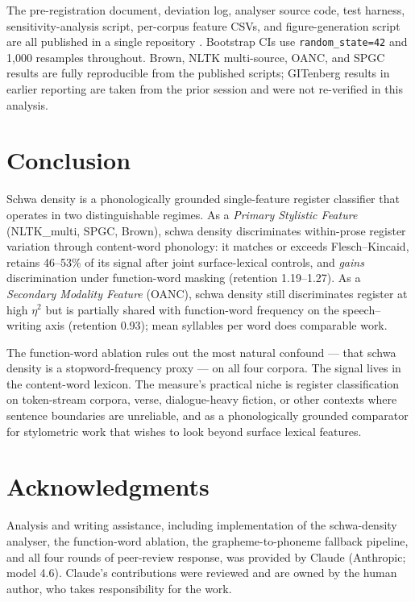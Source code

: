\documentclass[11pt,a4paper]{article}
\begin{document}
The pre-registration document, deviation log, analyser source code,
test harness, sensitivity-analysis script, per-corpus feature CSVs,
and figure-generation script are all published in a single repository
\citep{repo}. Bootstrap CIs use \texttt{random\_state=42} and 1{,}000
resamples throughout. Brown, NLTK multi-source, OANC, and SPGC results
are fully reproducible from the published scripts; GITenberg results
in earlier reporting are taken from the prior session and were not
re-verified in this analysis.

\section{Conclusion}

Schwa density is a phonologically grounded single-feature register
classifier that operates in two distinguishable regimes. As a
\emph{Primary Stylistic Feature} (NLTK\_multi, SPGC, Brown), schwa
density discriminates within-prose register variation through
content-word phonology: it matches or exceeds Flesch--Kincaid, retains
46--53\% of its signal after joint surface-lexical controls, and
\emph{gains} discrimination under function-word masking (retention
1.19--1.27). As a \emph{Secondary Modality Feature} (OANC), schwa
density still discriminates register at high \(\eta^2\) but is
partially shared with function-word frequency on the speech--writing
axis (retention 0.93); mean syllables per word does comparable work.

The function-word ablation rules out the most natural confound ---
that schwa density is a stopword-frequency proxy --- on all four
corpora. The signal lives in the content-word lexicon. The measure's
practical niche is register classification on token-stream corpora,
verse, dialogue-heavy fiction, or other contexts where sentence
boundaries are unreliable, and as a phonologically grounded comparator
for stylometric work that wishes to look beyond surface lexical
features.

\section*{Acknowledgments}

Analysis and writing assistance, including implementation of the
schwa-density analyser, the function-word ablation, the
grapheme-to-phoneme fallback pipeline, and all four rounds of
peer-review response, was provided by Claude (Anthropic; model 4.6).
Claude's contributions were reviewed and are owned by the human
author, who takes responsibility for the work.
\end{document}
